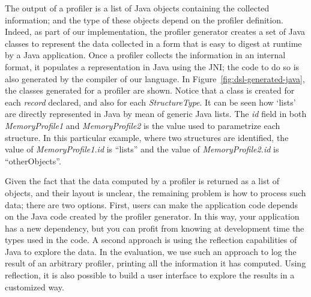The output of a profiler is a list of Java objects containing the collected information; and the type of these objects depend on the profiler definition.
Indeed, as part of our implementation, the profiler generator creates a set of Java classes to represent the data collected in a form that is easy to digest at runtime by a Java application.
Once a profiler collects the information in an internal format, it populates a representation in Java using the \gls{JNI}; the code to do so is also generated by the compiler of our language.
In Figure~\ref{fig:dsl-generated-java}, the classes generated for a profiler are shown.
Notice that a class is created for each \textit{record} declared, and also for each \textit{StructureType}.
It can be seen how `lists' are directly represented in Java by mean of generic Java lists.
The \textit{id} field in both \textit{MemoryProfile1} and \textit{MemoryProfile2} is the value used to parametrize each structure.
In this particular example, where two structures are identified, the value of \textit{MemoryProfile1.id} is ``lists'' and the value of \textit{MemoryProfile2.id} is ``otherObjects''.

Given the fact that the data computed by a profiler is returned as a list of objects, and their layout is unclear, the remaining problem is how to process such data; there are two options.
First, users can make the application code depends on the Java code created by the profiler generator.
In this way, your application has a new dependency, but you can profit from knowing at development time the types used in the code.
A second approach is using the reflection capabilities of Java to explore the data.
In the evaluation, we use such an approach to log the result of an arbitrary profiler, printing all the information it has computed.
Using reflection, it is also possible to build a user interface to explore the results in a customized way.  

